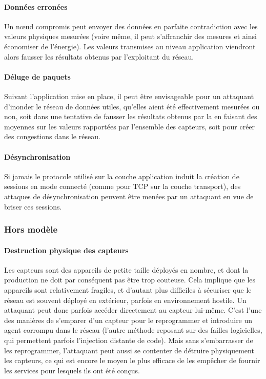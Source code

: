         \paragraph{Données erronées}
Un nœud compromis peut envoyer des données en parfaite contradiction avec les valeurs physiques mesurées (voire même, il peut s'affranchir des mesures et ainsi économiser de l'énergie).
Les valeurs transmises au niveau application viendront alors fausser les résultats obtenus par l'exploitant du réseau.

        \paragraph{Déluge de paquets}
Suivant l'application mise en place, il peut être envisageable pour un attaquant d'inonder le réseau de données utiles, qu'elles aient été effectivement mesurées ou non, soit dans une tentative de fausser les résultats obtenus par la \sdb en faisant des moyennes sur les valeurs rapportées par l'ensemble des capteurs, soit pour créer des congestions dans le réseau.

        \paragraph{Désynchronisation}
Si jamais le protocole utilisé sur la couche application induit la création de sessions en mode connecté (comme pour TCP sur la couche transport), des attaques de désynchronisation peuvent être menées par un attaquant en vue de briser ces sessions.

    \subsubsection{Hors modèle}
        \paragraph{Destruction physique des capteurs}
Les capteurs sont des appareils de petite taille déployés en nombre, et dont la production ne doit par conséquent pas être trop couteuse.
Cela implique que les appareils sont relativement fragiles, et d'autant plus difficiles à sécuriser que le réseau est souvent déployé en extérieur, parfois en environnement hostile.
Un attaquant peut donc parfois accéder directement au capteur lui-même.
C'est l'une des manières de s'emparer d'un capteur pour le reprogrammer et introduire un agent corrompu dans le réseau (l'autre méthode reposant sur des failles logicielles, qui permettent parfois l'injection distante de code).
Mais sans s'embarrasser de les reprogrammer, l'attaquant peut aussi se contenter de détruire physiquement les capteurs, ce qui est encore le moyen le plus efficace de les empêcher de fournir les services pour lesquels ils ont été conçus.

